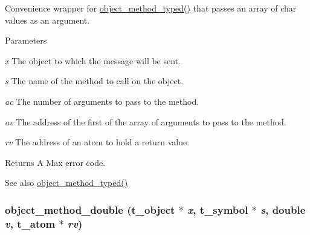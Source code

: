 Convenience wrapper for \hyperlink{group__obj_ga443dee482af22e0fe83e68955d367226}{object\_\-method\_\-typed()} that passes an array of char values as an argument. 
\begin{DoxyParams}{Parameters}
\item[{\em x}]The object to which the message will be sent. \item[{\em s}]The name of the method to call on the object. \item[{\em ac}]The number of arguments to pass to the method. \item[{\em av}]The address of the first of the array of arguments to pass to the method. \item[{\em rv}]The address of an atom to hold a return value.\end{DoxyParams}
\begin{DoxyReturn}{Returns}
A Max error code. 
\end{DoxyReturn}
\begin{DoxySeeAlso}{See also}
\hyperlink{group__obj_ga443dee482af22e0fe83e68955d367226}{object\_\-method\_\-typed()} 
\end{DoxySeeAlso}
\hypertarget{group__obj_ga736ef8fbda2c79dd13a88f6ab81a9f9f}{
\subsubsection[{object\_\-method\_\-double}]{ object\_\-method\_\-double ({\bf t\_\-object} $\ast$ {\em x}, \/  {\bf t\_\-symbol} $\ast$ {\em s}, \/  double {\em v}, \/  {\bf t\_\-atom} $\ast$ {\em rv})}}
\label{group__obj_ga736ef8fbda2c79dd13a88f6ab81a9f9f}


